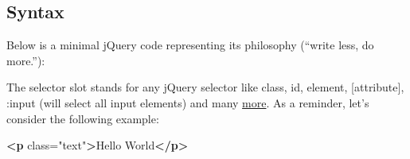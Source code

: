 \documentclass[]{book}
\newenvironment{Shaded}{\begin{snugshade}}{\end{snugshade}}
\newcommand{\AttributeTok}[1]{\textcolor[rgb]{0.77,0.63,0.00}{#1}}
\newcommand{\CommentTok}[1]{\textcolor[rgb]{0.56,0.35,0.01}{\textit{#1}}}
\newcommand{\DataTypeTok}[1]{\textcolor[rgb]{0.13,0.29,0.53}{#1}}
\newcommand{\KeywordTok}[1]{\textcolor[rgb]{0.13,0.29,0.53}{\textbf{#1}}}
\newcommand{\NormalTok}[1]{#1}
\newcommand{\OperatorTok}[1]{\textcolor[rgb]{0.81,0.36,0.00}{\textbf{#1}}}
\newcommand{\OtherTok}[1]{\textcolor[rgb]{0.56,0.35,0.01}{#1}}
\newcommand{\StringTok}[1]{\textcolor[rgb]{0.31,0.60,0.02}{#1}}
\begin{document}
\begin{Shaded}
\end{Shaded}

\hypertarget{syntax}{%
\subsection{Syntax}\label{syntax}}

Below is a minimal jQuery code representing its philosophy (``write less, do more.''):

\begin{Shaded}
\end{Shaded}

The selector slot stands for any jQuery selector like class, id, element, {[}attribute{]}, :input (will select all input elements) and many \href{https://www.w3schools.com/jquery/jquery_ref_selectors.asp}{more}. As a reminder, let's consider the following example:

\begin{Shaded}
\begin{Highlighting}[]
\KeywordTok{<p}\OtherTok{ class=}\StringTok{"text"}\KeywordTok{>}\NormalTok{Hello World}\KeywordTok{</p>}
\end{Highlighting}
\end{Shaded}
\end{document}

